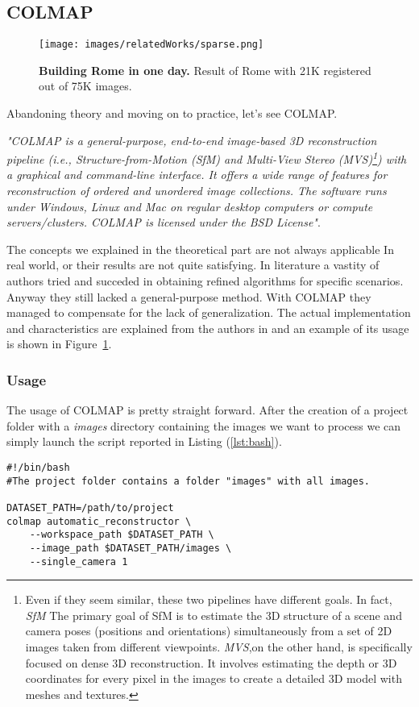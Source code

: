 \subsection{COLMAP}\label{sec:col}
\begin{figure}
    \centering
    \texttt{[image: images/relatedWorks/sparse.png]} %
    \caption{\textbf{Building Rome in one day.} Result of Rome with 21K registered out of 75K images.}\label{fig:colmap_image}
\end{figure}
Abandoning theory and moving on to practice, let's see COLMAP.

\textit{"COLMAP is a general-purpose, end-to-end image-based 
3D reconstruction pipeline (i.e., Structure-from-Motion (SfM)
 and Multi-View Stereo (MVS)\footnote{Even if they seem similar, these
 two pipelines have different goals. In fact, \textit{SfM} The
  primary goal of SfM is to estimate the 3D structure of 
  a scene and camera poses (positions and orientations) 
  simultaneously from a set of 2D images taken from different
   viewpoints. \textit{MVS},on the other hand, is specifically focused on dense 3D reconstruction. It involves estimating the depth or 3D coordinates 
   for every pixel in the images to create a detailed 3D model with
   meshes and textures.
}) with a graphical and command-line 
 interface. It offers a wide range of features for 
 reconstruction of ordered and unordered image collections. 
 The software runs under Windows, Linux and Mac on regular
  desktop computers or compute servers/clusters. COLMAP is
   licensed under the BSD License"}\cite{colmap}.

The concepts we explained in the theoretical part are not always applicable In
real world, or their results are not quite satisfying. In literature a vastity of authors
tried and succeded in obtaining refined algorithms for specific scenarios. 
Anyway they still lacked a general-purpose method. With COLMAP they managed
to compensate for the lack of generalization. The actual implementation and characteristics
are explained from the authors in \cite{schoenberger2016sfm,schoenberger2016mvs} and an example of its usage is shown in Figure~\ref{fig:colmap_image}.

\subsubsection{Usage}
The usage of COLMAP is pretty straight forward. After the creation of a project
folder with a \textit{images} directory containing the images we want to process we 
can simply launch the script reported in Listing (\ref{lst:bash}).
\begin{lstlisting}[style=vscode, caption={Automatic COLMAP Reconstruction}, label={lst:bash}]
#!/bin/bash
#The project folder contains a folder "images" with all images.

DATASET_PATH=/path/to/project
colmap automatic_reconstructor \
    --workspace_path $DATASET_PATH \
    --image_path $DATASET_PATH/images \
    --single_camera 1
    \end{lstlisting}

